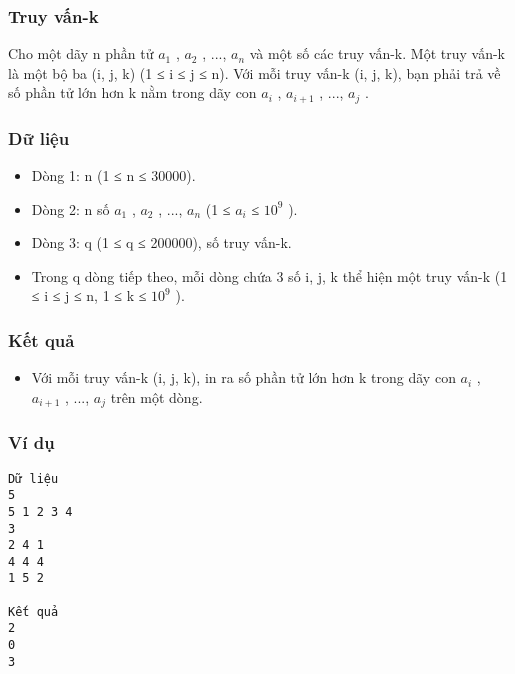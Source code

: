 



\subsubsection{   Truy vấn-k  }

   Cho một dãy n phần tử $a_{1}$   ,   $a_{2}$   , ..., $a_{n}$   và một số các truy vấn-k. Một truy vấn-k là một bộ ba (i, j, k) (1 ≤ i ≤ j ≤ n). Với mỗi truy vấn-k (i, j, k), bạn phải trả về số phần tử lớn hơn k nằm trong dãy con $a_{i}$   ,   $a_{i+1}$   , ..., $a_{j}$   .  

\subsubsection{   Dữ liệu  }
\begin{itemize}
	\item     Dòng 1: n (1 ≤ n ≤ 30000).   
	\item     Dòng 2: n số $a_{1}$    , $a_{2}$    , ...,   $a_{n}$    (1 ≤ $a_{i}$    ≤   $10^{9}$    ).   
	\item     Dòng 3: q (1 ≤ q ≤ 200000), số truy vấn-k.   
	\item     Trong q dòng tiếp theo, mỗi dòng chứa 3 số i, j, k   thể hiện một truy vấn-k (1 ≤ i ≤ j ≤ n, 1 ≤ k ≤   $10^{9}$    ).   
\end{itemize}

\subsubsection{   Kết quả  }
\begin{itemize}
	\item     Với mỗi truy vấn-k (i, j, k), in ra số phần tử lớn hơn k trong dãy con $a_{i}$    ,   $a_{i+1}$    , ..., $a_{j}$    trên một dòng.    


\end{itemize}

\subsubsection{   Ví dụ  }
\begin{verbatim}
Dữ liệu
5
5 1 2 3 4
3
2 4 1
4 4 4
1 5 2 

Kết quả
2
0
3 
\end{verbatim}
